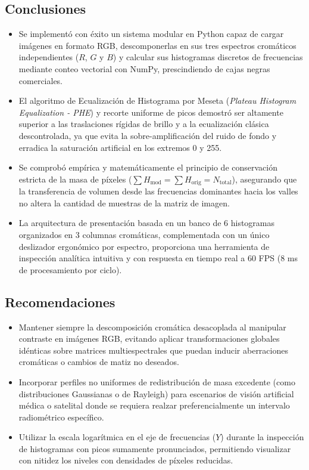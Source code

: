 \documentclass{article}
\begin{document}
\subsection{Conclusiones}
\begin{itemize}
    \item Se implementó con éxito un sistema modular en Python capaz de cargar imágenes en formato RGB, descomponerlas en sus tres espectros cromáticos independientes ($R$, $G$ y $B$) y calcular sus histogramas discretos de frecuencias mediante conteo vectorial con NumPy, prescindiendo de cajas negras comerciales.
    \item El algoritmo de Ecualización de Histograma por Meseta (\textit{Plateau Histogram Equalization - PHE}) y recorte uniforme de picos demostró ser altamente superior a las traslaciones rígidas de brillo y a la ecualización clásica descontrolada, ya que evita la sobre-amplificación del ruido de fondo y erradica la saturación artificial en los extremos 0 y 255.
    \item Se comprobó empírica y matemáticamente el principio de conservación estricta de la masa de píxeles ($\sum H_{\text{mod}} = \sum H_{\text{orig}} = N_{\text{total}}$), asegurando que la transferencia de volumen desde las frecuencias dominantes hacia los valles no altera la cantidad de muestras de la matriz de imagen.
    \item La arquitectura de presentación basada en un banco de 6 histogramas organizados en 3 columnas cromáticas, complementada con un único deslizador ergonómico por espectro, proporciona una herramienta de inspección analítica intuitiva y con respuesta en tiempo real a 60 FPS ($8$ ms de procesamiento por ciclo).
\end{itemize}

\subsection{Recomendaciones}
\begin{itemize}
    \item Mantener siempre la descomposición cromática desacoplada al manipular contraste en imágenes RGB, evitando aplicar transformaciones globales idénticas sobre matrices multiespectrales que puedan inducir aberraciones cromáticas o cambios de matiz no deseados.
    \item Incorporar perfiles no uniformes de redistribución de masa excedente (como distribuciones Gaussianas o de Rayleigh) para escenarios de visión artificial médica o satelital donde se requiera realzar preferencialmente un intervalo radiométrico específico.
    \item Utilizar la escala logarítmica en el eje de frecuencias ($Y$) durante la inspección de histogramas con picos sumamente pronunciados, permitiendo visualizar con nitidez los niveles con densidades de píxeles reducidas.
\end{itemize}
\end{document}
